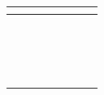 \documentclass[12pt, oneside]{article}
\begin{document}
\begin{multicols}{2}
\begin{tabular}{|c|c|c|c|c|c|c|}
  \hline
  \multicolumn{7}{|c|}{\phantom{A}}\\
  \hline
  \phantom{AA} & \phantom{AA}& \phantom{AA}& \phantom{AA}& \phantom{AA}& \phantom{AA}& \phantom{AA} \\
  \hline
  \multicolumn{7}{|c|}{\phantom{A}}\\
  \hline
  \phantom{AA} & \phantom{AA}& \phantom{AA}& \phantom{AA}& \phantom{AA}& \phantom{AA}& \phantom{AA} \\
  \hline
  \multicolumn{7}{|c|}{\phantom{A}}\\
  \hline
  \phantom{AA} & \phantom{AA}& \phantom{AA}& \phantom{AA}& \phantom{AA}& \phantom{AA}& \phantom{AA} \\
  \hline
  \multicolumn{7}{|c|}{\phantom{A}}\\
  \hline
  \phantom{AA} & \phantom{AA}& \phantom{AA}& \phantom{AA}& \phantom{AA}& \phantom{AA}& \phantom{AA} \\
  \hline
  \multicolumn{7}{|c|}{\phantom{A}}\\
  \hline
  \phantom{AA} & \phantom{AA}& \phantom{AA}& \phantom{AA}& \phantom{AA}& \phantom{AA}& \phantom{AA} \\
  \hline
  \multicolumn{7}{|c|}{\phantom{A}}\\
  \hline
  \phantom{AA} & \phantom{AA}& \phantom{AA}& \phantom{AA}& \phantom{AA}& \phantom{AA}& \phantom{AA} \\
  \hline
  \multicolumn{7}{|c|}{\phantom{A}}\\
  \hline
  \phantom{AA} & \phantom{AA}& \phantom{AA}& \phantom{AA}& \phantom{AA}& \phantom{AA}& \phantom{AA} \\
  \hline
  \multicolumn{7}{|c|}{\phantom{A}}\\
  \hline
  \phantom{AA} & \phantom{AA}& \phantom{AA}& \phantom{AA}& \phantom{AA}& \phantom{AA}& \phantom{AA} \\
  \hline
  \end{tabular}
\end{multicols}
\end{document}
